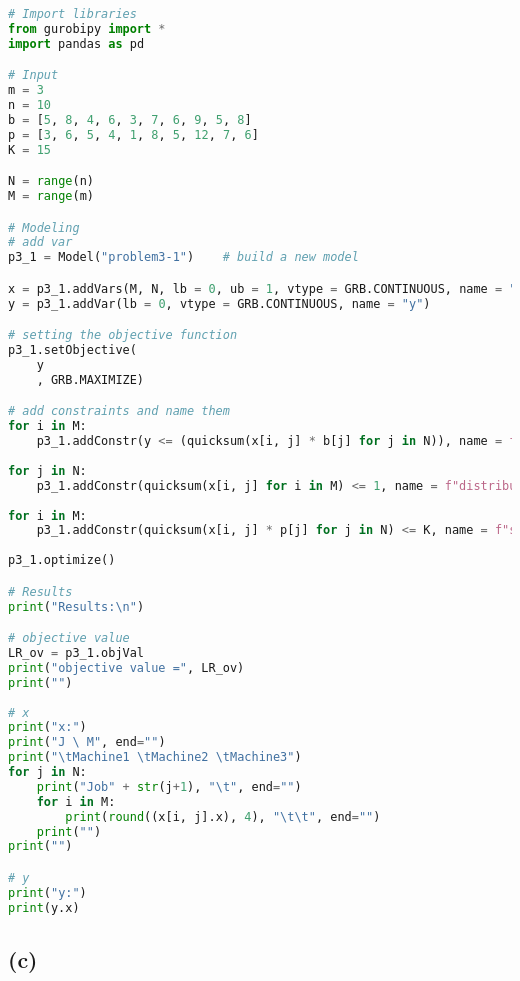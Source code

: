 \documentclass{article}
\begin{document}
\begin{lstlisting}[breaklines = true, language=Python]
# Import libraries
from gurobipy import *
import pandas as pd

# Input
m = 3
n = 10
b = [5, 8, 4, 6, 3, 7, 6, 9, 5, 8]
p = [3, 6, 5, 4, 1, 8, 5, 12, 7, 6]
K = 15

N = range(n)
M = range(m)

# Modeling
# add var
p3_1 = Model("problem3-1")    # build a new model

x = p3_1.addVars(M, N, lb = 0, ub = 1, vtype = GRB.CONTINUOUS, name = "x")
y = p3_1.addVar(lb = 0, vtype = GRB.CONTINUOUS, name = "y")

# setting the objective function 
p3_1.setObjective(
    y
    , GRB.MAXIMIZE) 

# add constraints and name them
for i in M:
    p3_1.addConstr(y <= (quicksum(x[i, j] * b[j] for j in N)), name = f"min benefit")
    
for j in N:
    p3_1.addConstr(quicksum(x[i, j] for i in M) <= 1, name = f"distribute to no more than 1 machine")
    
for i in M:
    p3_1.addConstr(quicksum(x[i, j] * p[j] for j in N) <= K, name = f"satisfy capacity")
    
p3_1.optimize()

# Results
print("Results:\n")

# objective value
LR_ov = p3_1.objVal
print("objective value =", LR_ov)
print("")
    
# x
print("x:")
print("J \ M", end="")
print("\tMachine1 \tMachine2 \tMachine3")
for j in N:
    print("Job" + str(j+1), "\t", end="")
    for i in M:
        print(round((x[i, j].x), 4), "\t\t", end="")
    print("")
print("")

# y
print("y:")
print(y.x)
\end{lstlisting}

\subsection{(c)}
\end{document}
